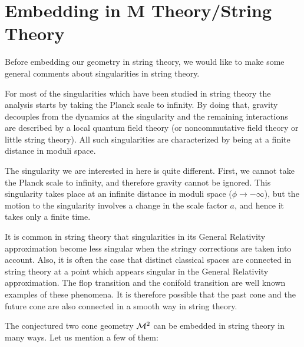 \documentclass[a4paper,12pt,oneside]{article}
\begin{document}
\setcounter{equation}{0}
\section{Embedding in M Theory/String Theory}

Before embedding our geometry in string theory, we would like to
make some general comments about singularities in string theory.

For most of the singularities which have been studied in string
theory the analysis starts by taking the Planck scale to
infinity. By doing that, gravity decouples from the dynamics at
the singularity and the remaining interactions are described by a
local quantum field theory (or noncommutative field theory or
little string theory). All such singularities are characterized
by being at a finite distance in moduli space.

The singularity we are interested in here is quite different.
First, we cannot take the Planck scale to infinity, and therefore
gravity cannot be ignored. This singularity takes place at an
infinite distance in moduli space ($\phi \to -\infty$), but the
motion to the singularity involves a change in the scale factor
$a$, and hence it takes only a finite time.

It is common in string theory that singularities in its General
Relativity approximation become less singular when the stringy
corrections are taken into account. Also, it is often the case
that distinct classical spaces are connected in string theory at a
point which appears singular in the General Relativity
approximation.  The flop transition \cite{flop} and the conifold
transition \cite{conifold} are well known examples of these
phenomena. It is therefore possible that the past cone and the
future cone are also connected in a smooth way in string theory.


The conjectured two cone geometry ${\cal M}^2$ can be embedded in
string theory in many ways.  Let us mention a few of them:
\end{document}
